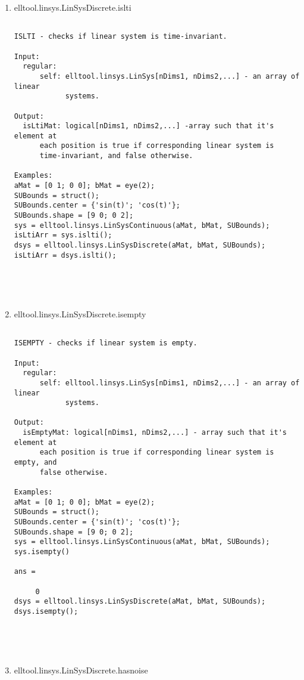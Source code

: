 \begin{enumerate}
\begin{lstlisting}
\end{lstlisting}
\fontfamily{\familydefault}
\selectfont
\item {elltool.linsys.LinSysDiscrete.islti}
\selectfont
\begin{lstlisting}

ISLTI - checks if linear system is time-invariant.

Input:
  regular:
      self: elltool.linsys.LinSys[nDims1, nDims2,...] - an array of linear
            systems.

Output:
  isLtiMat: logical[nDims1, nDims2,...] -array such that it's element at
      each position is true if corresponding linear system is
      time-invariant, and false otherwise.

Examples:
aMat = [0 1; 0 0]; bMat = eye(2);
SUBounds = struct();
SUBounds.center = {'sin(t)'; 'cos(t)'};
SUBounds.shape = [9 0; 0 2];
sys = elltool.linsys.LinSysContinuous(aMat, bMat, SUBounds);
isLtiArr = sys.islti();
dsys = elltool.linsys.LinSysDiscrete(aMat, bMat, SUBounds);
isLtiArr = dsys.islti();





\end{lstlisting}
\fontfamily{\familydefault}
\selectfont
\item {elltool.linsys.LinSysDiscrete.isempty}
\selectfont
\begin{lstlisting}

ISEMPTY - checks if linear system is empty.

Input:
  regular:
      self: elltool.linsys.LinSys[nDims1, nDims2,...] - an array of linear
            systems.

Output:
  isEmptyMat: logical[nDims1, nDims2,...] - array such that it's element at
      each position is true if corresponding linear system is empty, and
      false otherwise.

Examples:
aMat = [0 1; 0 0]; bMat = eye(2);
SUBounds = struct();
SUBounds.center = {'sin(t)'; 'cos(t)'};
SUBounds.shape = [9 0; 0 2];
sys = elltool.linsys.LinSysContinuous(aMat, bMat, SUBounds);
sys.isempty()

ans =

     0
dsys = elltool.linsys.LinSysDiscrete(aMat, bMat, SUBounds);
dsys.isempty();





\end{lstlisting}
\fontfamily{\familydefault}
\selectfont
\item {elltool.linsys.LinSysDiscrete.hasnoise}
\selectfont
\begin{lstlisting}


\end{lstlisting}
\end{enumerate}
